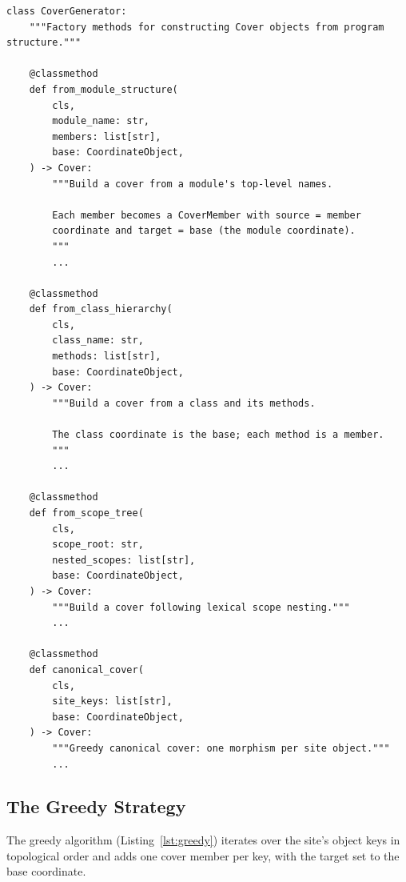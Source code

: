 \documentclass[11pt]{article}
\begin{document}
\begin{lstlisting}[style=jugeo-python,
  caption={\texttt{CoverGenerator} class from \texttt{src/jugeo/geometry/covers.py}.},
  label={lst:covgen}]
class CoverGenerator:
    """Factory methods for constructing Cover objects from program structure."""

    @classmethod
    def from_module_structure(
        cls,
        module_name: str,
        members: list[str],
        base: CoordinateObject,
    ) -> Cover:
        """Build a cover from a module's top-level names.

        Each member becomes a CoverMember with source = member
        coordinate and target = base (the module coordinate).
        """
        ...

    @classmethod
    def from_class_hierarchy(
        cls,
        class_name: str,
        methods: list[str],
        base: CoordinateObject,
    ) -> Cover:
        """Build a cover from a class and its methods.

        The class coordinate is the base; each method is a member.
        """
        ...

    @classmethod
    def from_scope_tree(
        cls,
        scope_root: str,
        nested_scopes: list[str],
        base: CoordinateObject,
    ) -> Cover:
        """Build a cover following lexical scope nesting."""
        ...

    @classmethod
    def canonical_cover(
        cls,
        site_keys: list[str],
        base: CoordinateObject,
    ) -> Cover:
        """Greedy canonical cover: one morphism per site object."""
        ...
\end{lstlisting}

\subsection{The Greedy Strategy}

The greedy algorithm (Listing~\ref{lst:greedy}) iterates over the
site's object keys in topological order and adds one cover member per
key, with the target set to the base coordinate.
\end{document}
